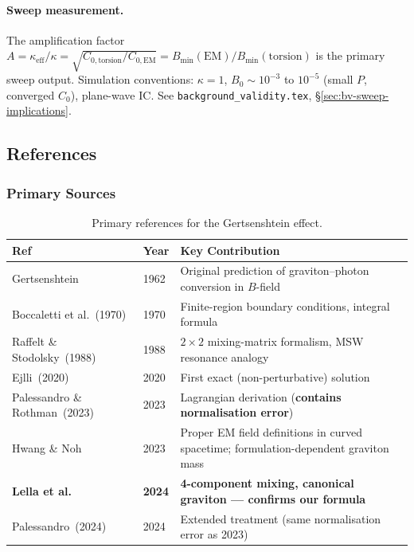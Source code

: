 \paragraph{Sweep measurement.}
The amplification factor
$A = \kappa_\text{eff}/\kappa = \sqrt{C_{0,\text{torsion}}/C_{0,\text{EM}}}
= B_\text{min}(\text{EM})/B_\text{min}(\text{torsion})$
is the primary sweep output.  Simulation conventions: $\kappa = 1$,
$B_0 \sim 10^{-3}$ to $10^{-5}$ (small $P$, converged $C_0$), plane-wave IC.
See \texttt{background\_validity.tex}, \S\ref{sec:bv-sweep-implications}.

\subsection{References}
\label{subsec:gertsenshtein-references}

\subsubsection{Primary Sources}
\label{subsec:primary-sources}

\begin{table}[htbp]
\centering
\caption{Primary references for the Gertsenshtein effect.}
\label{tab:gert-primary-refs}
\begin{tabular}{@{}lll@{}}
\toprule
Ref & Year & Key Contribution \\
\midrule
Gertsenshtein~\cite{gertsenshtein1962wave} & 1962 & Original prediction of graviton--photon conversion in $B$-field \\
Boccaletti et al.~(1970) & 1970 & Finite-region boundary conditions, integral formula \\
Raffelt \& Stodolsky~(1988) & 1988 & $2\times 2$ mixing-matrix formalism, MSW resonance analogy \\
Ejlli~(2020) & 2020 & First exact (non-perturbative) solution \\
Palessandro \& Rothman~(2023) & 2023 & Lagrangian derivation (\textbf{contains normalisation error}) \\
Hwang \& Noh~\cite{hwangnoh2023graviton} & 2023 & Proper EM field definitions in curved spacetime; formulation-dependent graviton mass \\
\textbf{Lella et al.}~\cite{lella2024constraining} & \textbf{2024} & \textbf{4-component mixing, canonical graviton --- confirms our formula} \\
Palessandro~(2024) & 2024 & Extended treatment (same normalisation error as 2023) \\
\bottomrule
\end{tabular}
\end{table}

